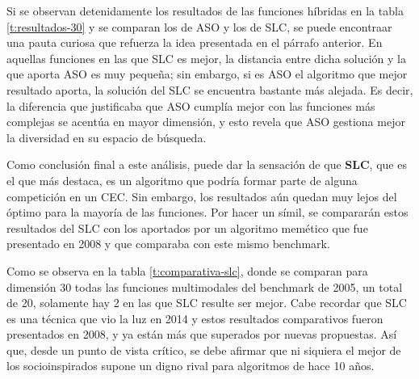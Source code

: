 Si se observan detenidamente los resultados de las funciones híbridas en la tabla \ref{t:resultados-30} y se comparan los de ASO y los de SLC, se puede encontraar una pauta curiosa que refuerza la idea presentada en el párrafo anterior. En aquellas funciones en las que SLC es mejor, la distancia entre dicha solución y la que aporta ASO es muy pequeña; sin embargo, si es ASO el algoritmo que mejor resultado aporta, la solución del SLC se encuentra bastante más alejada. Es decir, la diferencia que justificaba que ASO cumplía mejor con las funciones más complejas se acentúa en mayor dimensión, y esto revela que ASO gestiona mejor la diversidad en su espacio de búsqueda.

Como conclusión final a este análisis, puede dar la sensación de que \textbf{SLC}, que es el que más destaca, es un algoritmo que podría formar parte de alguna competición en un CEC. Sin embargo, los resultados aún quedan muy lejos del óptimo para la mayoría de las funciones. Por hacer un símil, se compararán estos resultados del SLC con los aportados por un algoritmo memético que fue presentado en 2008 \cite{memetic-conference} y que comparaba con este mismo benchmark.

Como se observa en la tabla \ref{t:comparativa-slc}, donde se comparan para dimensión 30 todas las funciones multimodales del benchmark de 2005, un total de 20, solamente hay 2 en las que SLC resulte ser mejor. Cabe recordar que SLC es una técnica que vio la luz en 2014 y estos resultados comparativos fueron presentados en 2008, y ya están más que superados por nuevas propuestas. Así que, desde un punto de vista crítico, se debe afirmar que ni siquiera el mejor de los socioinspirados supone un digno rival para algoritmos de hace 10 años.


